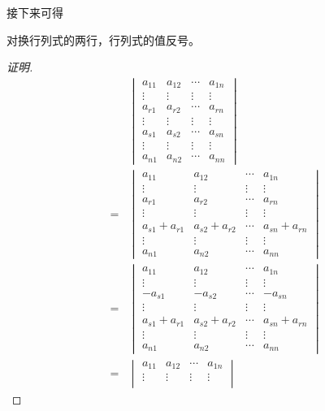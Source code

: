 接下来可得
\begin{property}
  对换行列式的两行，行列式的值反号。
\end{property}

\begin{proof}[证明]
  \begin{eqnarray*}
    & & 
  \begin{vmatrix}
    a_{11} & a_{12} & \cdots & a_{1n} \\
    \vdots & \vdots & \vdots & \vdots \\
    a_{r1} & a_{r2} & \cdots & a_{rn} \\
    \vdots & \vdots & \vdots & \vdots \\
    a_{s1} & a_{s2} & \cdots & a_{sn} \\
    \vdots & \vdots & \vdots & \vdots \\
    a_{n1} & a_{n2} & \cdots & a_{nn}
  \end{vmatrix}
    \\
    & = &
  \begin{vmatrix}
    a_{11} & a_{12} & \cdots & a_{1n} \\
    \vdots & \vdots & \vdots & \vdots \\
    a_{r1} & a_{r2} & \cdots & a_{rn} \\
    \vdots & \vdots & \vdots & \vdots \\
    a_{s1}+a_{r1} & a_{s2}+a_{r2} & \cdots & a_{sn}+a_{rn} \\
    \vdots & \vdots & \vdots & \vdots \\
    a_{n1} & a_{n2} & \cdots & a_{nn}
  \end{vmatrix}
    \\
    & = &
  \begin{vmatrix}
    a_{11} & a_{12} & \cdots & a_{1n} \\
    \vdots & \vdots & \vdots & \vdots \\
    -a_{s1} & -a_{s2} & \cdots & -a_{sn} \\
    \vdots & \vdots & \vdots & \vdots \\
    a_{s1}+a_{r1} & a_{s2}+a_{r2} & \cdots & a_{sn}+a_{rn} \\
    \vdots & \vdots & \vdots & \vdots \\
    a_{n1} & a_{n2} & \cdots & a_{nn}
  \end{vmatrix}
    \\
    & = &
  \begin{vmatrix}
    a_{11} & a_{12} & \cdots & a_{1n} \\
    \vdots & \vdots & \vdots & \vdots \\

\end{vmatrix}
\end{eqnarray*}
\end{proof}

